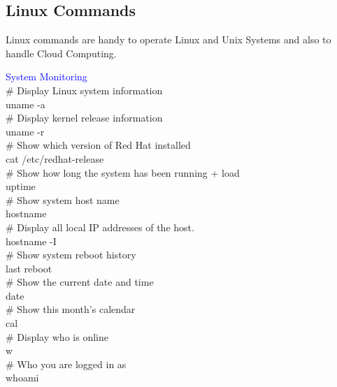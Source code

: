 \documentclass{article}
\begin{document}
\begin{center}
    \section*{Linux Commands}
\end{center}
\noindent
Linux commands are handy to operate Linux and Unix Systems and also to handle Cloud Computing. \\

\textcolor{blue}{System Monitoring}\\
\noindent
\# Display Linux system information\\
uname -a\\
\# Display kernel release information\\
uname -r\\
\# Show which version of Red Hat installed\\
cat /etc/redhat-release\\
\# Show how long the system has been running + load\\
uptime\\
\# Show system host name\\
hostname\\
\# Display all local IP addresses of the host.\\
hostname -I\\
\# Show system reboot history\\
last reboot\\
\# Show the current date and time\\
date\\
\# Show this month's calendar\\
cal\\
\# Display who is online\\
w\\
\# Who you are logged in as\\
whoami\\
\end{document}
